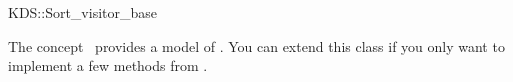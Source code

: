 

\begin{ccRefClass}{KDS::Sort_visitor_base}


\ccDefinition
  
The concept \ccRefName\ provides a model of
. You can extend this class if you only
want to implement a few methods from .

\ccIsModel


\ccCreation
{}  %


\ccSeeAlso



\end{ccRefClass}


